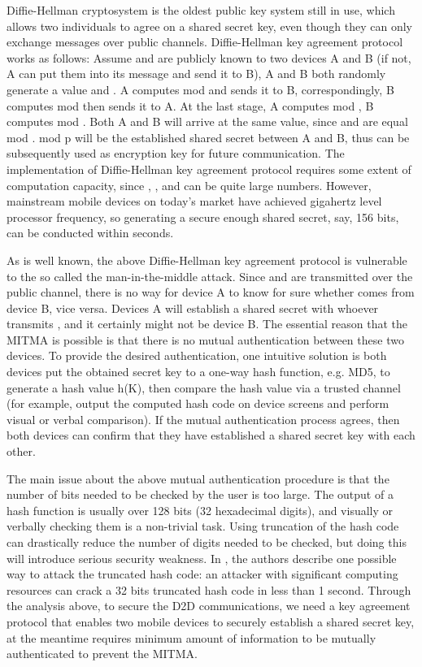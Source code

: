 \documentclass[conference]{IEEEtran}
\begin{document}
Diffie-Hellman cryptosystem is the oldest public key system still in use, which allows two individuals to agree on a shared secret key, even though they can only exchange messages over public channels. Diffie-Hellman key agreement protocol works as follows: Assume  and  are publicly known to two devices A and B (if not, A can put them into its message and send it to B), A and B both randomly generate a value  and . A computes  mod  and sends it to B, correspondingly, B computes  mod  then sends it to A. At the last stage, A computes  mod , B computes  mod . Both A and B will arrive at the same value, since  and  are equal mod .  mod p will be the established shared secret between A and B, thus can be subsequently used as encryption key for future communication. The implementation of Diffie-Hellman key agreement protocol requires some extent of computation capacity, since , , and  can be quite large numbers. However, mainstream mobile devices on today's market have achieved gigahertz level processor frequency, so generating a secure enough shared secret, say, 156 bits, can be conducted within seconds.

As is well known, the above Diffie-Hellman key agreement protocol is vulnerable to the so called the man-in-the-middle attack. Since  and  are transmitted over the public channel, there is no way for device A to know for sure whether  comes from device B, vice versa. Devices A will establish a shared secret with whoever transmits , and it certainly might not be device B. The essential reason that the MITMA is possible is that there is no mutual authentication between these two devices. To provide the desired authentication, one intuitive solution is both devices put the obtained secret key to a one-way hash function, e.g. MD5, to generate a hash value h(K), then compare the hash value via a trusted channel (for example, output the computed hash code on device screens and perform visual or verbal comparison). If the mutual authentication process agrees, then both devices can confirm that they have established a shared secret key with each other.

The main issue about the above mutual authentication procedure is that the number of bits needed to be checked by the user is too large. The output of a hash function is usually over 128 bits (32 hexadecimal digits), and visually or verbally checking them is a non-trivial task. Using truncation of the hash code can drastically reduce the number of digits needed to be checked, but doing this will introduce serious security weakness. In \cite{mana}, the authors describe one possible way to attack the truncated hash code: an attacker with significant computing resources can crack a 32 bits truncated hash code in less than 1 second.
Through the analysis above, to secure the D2D communications, we need a key agreement protocol that enables two mobile devices to securely establish a shared secret key, at the meantime requires minimum amount of information to be mutually authenticated to prevent the MITMA.
\end{document}
